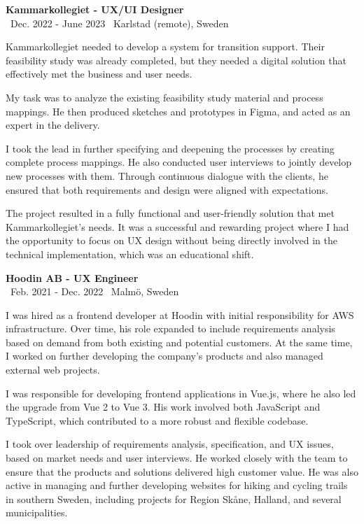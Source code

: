 \documentclass[a4paper,10pt]{article}
\begin{document}
\vspace{0.5cm}
\textbf{Kammarkollegiet - UX/UI Designer}\\
\normalsize \faCalendar \ Dec. 2022 - June 2023 \quad \faMapMarker \ Karlstad (remote), Sweden

Kammarkollegiet needed to develop a system for transition support. Their feasibility study was already completed, but they needed a digital solution that effectively met the business and user needs.

My task was to analyze the existing feasibility study material and process mappings. He then produced sketches and prototypes in Figma, and acted as an expert in the delivery.

I took the lead in further specifying and deepening the processes by creating complete process mappings. He also conducted user interviews to jointly develop new processes with them. Through continuous dialogue with the clients, he ensured that both requirements and design were aligned with expectations.

The project resulted in a fully functional and user-friendly solution that met Kammarkollegiet's needs. It was a successful and rewarding project where I had the opportunity to focus on UX design without being directly involved in the technical implementation, which was an educational shift.

\vspace{0.5cm}
\textbf{Hoodin AB - UX Engineer}\\
\normalsize \faCalendar \ Feb. 2021 - Dec. 2022 \quad \faMapMarker \ Malmö, Sweden

I was hired as a frontend developer at Hoodin with initial responsibility for AWS infrastructure. Over time, his role expanded to include requirements analysis based on demand from both existing and potential customers. At the same time, I worked on further developing the company's products and also managed external web projects.

I was responsible for developing frontend applications in Vue.js, where he also led the upgrade from Vue 2 to Vue 3. His work involved both JavaScript and TypeScript, which contributed to a more robust and flexible codebase.

I took over leadership of requirements analysis, specification, and UX issues, based on market needs and user interviews. He worked closely with the team to ensure that the products and solutions delivered high customer value. He was also active in managing and further developing websites for hiking and cycling trails in southern Sweden, including projects for Region Skåne, Halland, and several municipalities.
\end{document}
